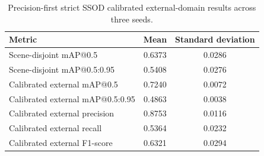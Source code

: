 ﻿\documentclass[12pt]{article}
\begin{document}
\begin{table}[h]
\centering
\caption{Precision-first strict SSOD calibrated external-domain results across three seeds.}
\label{tab:strict_ssod}
\begin{tabular}{lcc}
\toprule
Metric & Mean & Standard deviation \\
\midrule
Scene-disjoint mAP@0.5 & 0.6373 & 0.0286 \\
Scene-disjoint mAP@0.5:0.95 & 0.5408 & 0.0276 \\
Calibrated external mAP@0.5 & 0.7240 & 0.0072 \\
Calibrated external mAP@0.5:0.95 & 0.4863 & 0.0038 \\
Calibrated external precision & 0.8753 & 0.0116 \\
Calibrated external recall & 0.5364 & 0.0232 \\
Calibrated external F1-score & 0.6321 & 0.0294 \\
\bottomrule
\end{tabular}
\end{table}

\begin{table}[h]
\centering
\caption{Third-domain zero-shot image-level evaluation. Detection mAP is not reported for this dataset because the protocol is image-level.}
\label{tab:third_domain}
\end{table}

\begin{table}[h]
\centering
\caption{Seed-2026 under-ripe class analysis on the locked external dataset.}
\label{tab:under_ripe}
\end{table}
\end{document}
